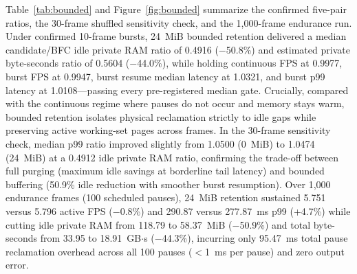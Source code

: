 \documentclass[sigconf,screen,nonacm]{acmart}
\begin{document}
Table~\ref{tab:bounded} and Figure~\ref{fig:bounded} summarize the confirmed five-pair ratios, the 30-frame shuffled sensitivity check, and the 1,000-frame endurance run. Under confirmed 10-frame bursts, 24~MiB bounded retention delivered a median candidate/BFC idle private RAM ratio of 0.4916 ($-$50.8\%) and estimated private byte-seconds ratio of 0.5604 ($-$44.0\%), while holding continuous FPS at 0.9977, burst FPS at 0.9947, burst resume median latency at 1.0321, and burst p99 latency at 1.0108---passing every pre-registered median gate. Crucially, compared with the continuous regime where pauses do not occur and memory stays warm, bounded retention isolates physical reclamation strictly to idle gaps while preserving active working-set pages across frames. In the 30-frame sensitivity check, median p99 ratio improved slightly from 1.0500 (0~MiB) to 1.0474 (24~MiB) at a 0.4912 idle private RAM ratio, confirming the trade-off between full purging (maximum idle savings at borderline tail latency) and bounded buffering (50.9\% idle reduction with smoother burst resumption). Over 1,000 endurance frames (100 scheduled pauses), 24~MiB retention sustained 5.751 versus 5.796 active FPS ($-$0.8\%) and 290.87 versus 277.87~ms p99 (+4.7\%) while cutting idle private RAM from 118.79 to 58.37~MiB ($-$50.9\%) and total byte-seconds from 33.95 to 18.91~GB$\cdot$s ($-$44.3\%), incurring only 95.47~ms total pause reclamation overhead across all 100 pauses ($<$1~ms per pause) and zero output error.
\end{document}
